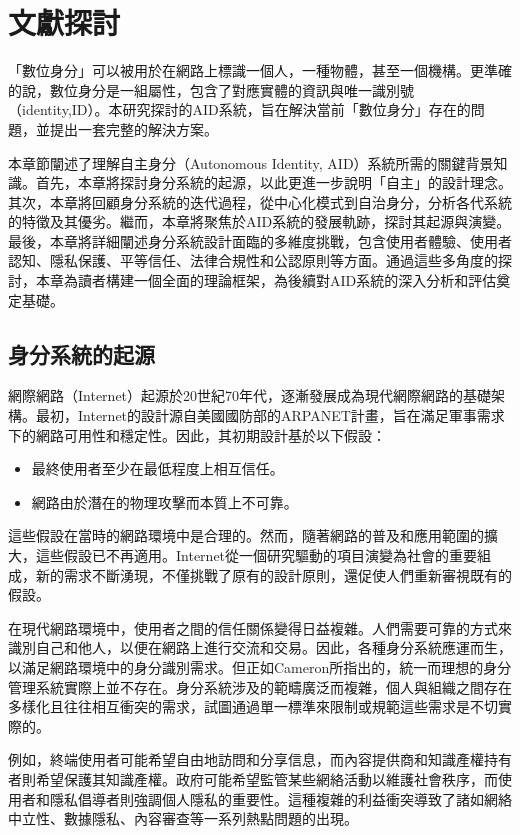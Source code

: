 
\chapter{文獻探討}
「數位身分」可以被用於在網路上標識一個人，一種物體，甚至一個機構。更準確的說，數位身分是一組屬性，包含了對應實體的資訊與唯一識別號（identity,ID）。本研究探討的AID系統，旨在解決當前「數位身分」存在的問題，並提出一套完整的解決方案。

本章節闡述了理解自主身分（Autonomous Identity, AID）系統所需的關鍵背景知識。首先，本章將探討身分系統的起源，以此更進一步說明「自主」的設計理念。其次，本章將回顧身分系統的迭代過程，從中心化模式到自治身分，分析各代系統的特徵及其優劣。繼而，本章將聚焦於AID系統的發展軌跡，探討其起源與演變。最後，本章將詳細闡述身分系統設計面臨的多維度挑戰，包含使用者體驗、使用者認知、隱私保護、平等信任、法律合規性和公認原則等方面。通過這些多角度的探討，本章為讀者構建一個全面的理論框架，為後續對AID系統的深入分析和評估奠定基礎。
\section{身分系統的起源}
網際網路（Internet）起源於20世紀70年代，逐漸發展成為現代網際網路的基礎架構。最初，Internet的設計源自美國國防部的ARPANET計畫，旨在滿足軍事需求下的網路可用性和穩定性。因此，其初期設計基於以下假設\cite{Pekka2010HIP}：
\begin{itemize}
  \item 最終使用者至少在最低程度上相互信任。
  \item 網路由於潛在的物理攻擊而本質上不可靠。
\end{itemize}
這些假設在當時的網路環境中是合理的。然而，隨著網路的普及和應用範圍的擴大，這些假設已不再適用\cite{tomorrowinternet}。Internet從一個研究驅動的項目演變為社會的重要組成，新的需求不斷湧現，不僅挑戰了原有的設計原則，還促使人們重新審視既有的假設。

在現代網路環境中，使用者之間的信任關係變得日益複雜。人們需要可靠的方式來識別自己和他人，以便在網路上進行交流和交易。因此，各種身分系統應運而生，以滿足網路環境中的身分識別需求。但正如Cameron\cite{cameron2005laws}所指出的，統一而理想的身分管理系統實際上並不存在。身分系統涉及的範疇廣泛而複雜，個人與組織之間存在多樣化且往往相互衝突的需求，試圖通過單一標準來限制或規範這些需求是不切實際的。

例如，終端使用者可能希望自由地訪問和分享信息，而內容提供商和知識產權持有者則希望保護其知識產權。政府可能希望監管某些網絡活動以維護社會秩序，而使用者和隱私倡導者則強調個人隱私的重要性。這種複雜的利益衝突導致了諸如網絡中立性、數據隱私、內容審查等一系列熱點問題的出現\cite{Wu2003NetworkNeutrality}。

